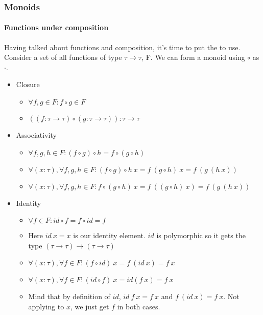 \documentclass{beamer}
\begin{document}
\begin{frame}
  \frametitle{Monoids}
  \framesubtitle{Functions under composition}
  Having talked about functions and composition, it's time to put the
  to use. Consider a set of all functions of type $\tau \rightarrow \tau$,
  F. We can form a monoid using $\circ$ as $\cdot$.
  \pause
  \begin{itemize}[<+->]
    \item Closure
      \begin{itemize}
        \item $\forall f,g \in F : f \circ g \in F$
        \item $((f:\tau \rightarrow \tau) \circ (g:\tau \rightarrow \tau)):\tau \rightarrow \tau$
      \end{itemize}
    \item Associativity
      \begin{itemize}
        \item $\forall f,g,h \in F : (f \circ g) \circ h = f
          \circ (g \circ h)$
        \item $\forall (x:\tau),\forall f,g,h \in F : (f \circ g) \circ
          h\:x = f\:(g \circ h)\:x = f\:(g\:(h\:x))$
        \item $\forall (x:\tau),\forall f,g,h \in F : f \circ (g \circ
          h)\:x = f\:((g \circ h)\:x) = f\:(g\:(h\:x))$
      \end{itemize}
    \item Identity
      \begin{itemize}
        \item $\forall f \in F: id \circ f = f \circ id = f$
        \item Here $id\:x = x$ is our identity element. $id$ is
          polymorphic so it gets the type $(\tau \rightarrow \tau)
          \rightarrow (\tau \rightarrow \tau)$
        \item $\forall (x:\tau),\forall f \in F: (f \circ id)\:x = f\:(id\:x) = f\:x$
        \item $\forall (x:\tau),\forall f \in F: (id \circ f)\:x =
          id(f\:x) = f\:x$
        \item Mind that by definition of $id$, $id\:f\:x = f\:x$ and
          $f\:(id\:x) = f\:x$. Not applying to $x$, we just get $f$ in
          both cases.
      \end{itemize}
  \end{itemize}
\end{frame}
\end{document}

